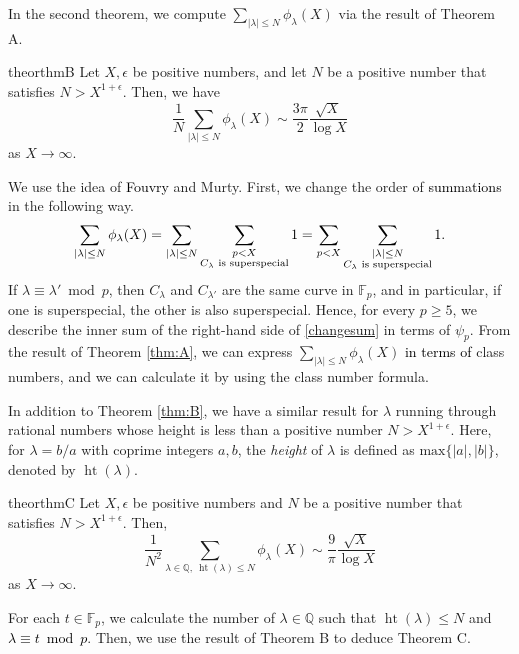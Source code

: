 \documentclass[10pt,a4paper]{amsart}
\theoremstyle{plain}
\newcommand{\lm}{\lambda}
\newcommand{\llm}{{\lambda}'}
\newcommand{\fp}{\mathbb{F}_p}
\newcommand{\bQ}{\mathbb{Q}}
\newcommand{\height}{\operatorname{ht}}
\begin{document}
In the second theorem, we compute $\sum_{\lvert \lm \rvert \le N} {\phi}_{\lm}(X)$ via the result of Theorem A. 
\begin{restatable}{theor}{thmB} \label{thm:B}
    Let $X,\epsilon$ be positive numbers, and let $N$ be a positive number that satisfies $N > X^{1+\epsilon}$. Then, we have
    \[
   \frac{1}{N} \sum_{\lvert \lm \rvert \le N} {\phi}_{\lm}(X) \sim \frac{3\pi}{2} \frac{\sqrt{X}}{\log X} 
    \]
    as $X \rightarrow \infty$.
\end{restatable}

We use the idea of \textcolor{black}{Fouvry} and Murty. First, we change the order of \textcolor{black}{summations} in the following way.
\begin{eqnarray}
\label{changesum}
\sum_{|\lm| \le N} {\phi}_{\lm}(X) =  \sum_{|\lm| \le N} \sum_{\substack{p < X \\  C_{\lm} \text{ is superspecial} }} 1 
= \sum_{p < X} \sum_{\substack{|\lm| \le N \\ C_{\lm} \text{ is superspecial} }} 1 \textcolor{black}{.}
\end{eqnarray}
If $\lm \equiv \llm \bmod p$, then $C_{\lm}$ and $C_{\llm}$ are the same curve in $\fp$, and in particular, if one is superspecial, the other is also superspecial. Hence, for every $p \ge 5$, we describe
the inner sum of the right-hand side of \eqref{changesum} in terms of ${\psi}_p$.
From the result of Theorem \ref{thm:A}, we can express $\sum_{|\lm| \le N} {\phi}_{\lm}(X)$ \textcolor{black}{in terms of} class numbers, and we can calculate it by using the class number formula.

In addition to Theorem \ref{thm:B}, we have a similar result for $\lm$ running through rational numbers whose height is less than a 
 positive number $N > X^{1+ \epsilon}$. Here, for $\lm = b/a$ with coprime integers $a,b$, the \textit{height} of $\lm$ is defined as
 $\text{max}\{|a|,|b|\}$, denoted by $\height(\lm)$.   

 \begin{restatable}{theor}{thmC} \label{thm:C}
      Let $X,\epsilon$ be positive numbers and $N$ be a positive number that satisfies $N > X^{1+\epsilon}$. Then,
    \[
   \frac{1}{N^2} \sum_{\lm \in \bQ,\ \height(\lm) \le N } {\phi}_{\lm}(X) \sim \frac{9}{\pi} \frac{\sqrt{X}}{\log X} 
    \]
    as $X \rightarrow \infty$.
 \end{restatable}
 
For each $t \in \fp$, we calculate the number of $\lm \in \bQ $ such that $\height(\lm) \le N$ and \textcolor{black}{$\lm \equiv t \bmod p$}. Then, we use the result of Theorem B to deduce Theorem C.
\end{document}
